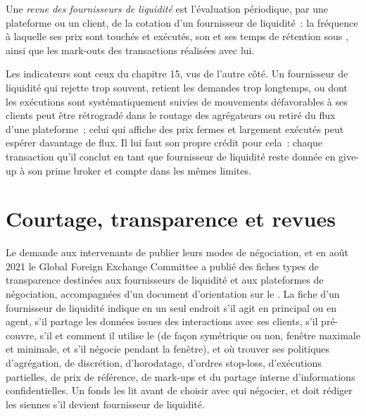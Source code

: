 \begin{definition}\label{def:m2:getting-access-fx:review}
Une \emph{revue des fournisseurs de liquidité} est l'évaluation périodique,
par une plateforme ou un client, de la cotation d'un fournisseur de liquidité~: la fréquence à laquelle ses prix
sont touchés et exécutés, son  et ses temps de rétention sous , ainsi que les
mark-outs des transactions réalisées avec lui.
\end{definition}

Les indicateurs sont ceux du chapitre 15, vus de l'autre côté. Un fournisseur de liquidité
qui rejette trop souvent, retient les demandes trop longtemps, ou dont les exécutions sont systématiquement
suivies de mouvements défavorables à ses clients peut être rétrogradé dans le routage des agrégateurs ou
retiré du flux d'une plateforme~; celui qui affiche des prix fermes et largement exécutés peut espérer davantage de flux.
Il lui faut son propre crédit pour cela~: chaque transaction qu'il conclut en tant que fournisseur de liquidité reste
donnée en give-up à son prime broker et compte dans les mêmes limites.

\section{Courtage, transparence et revues}

Le  demande aux intervenants de publier leurs modes de négociation, et en août
2021 le Global Foreign Exchange Committee a publié des fiches types de transparence
destinées aux fournisseurs de liquidité et aux plateformes de négociation, accompagnées d'un document d'orientation sur le .
La fiche d'un fournisseur de liquidité indique en un seul endroit s'il agit en principal ou
en agent, s'il partage les données issues des interactions avec ses clients, s'il pré-couvre, s'il
et comment il utilise le  (de façon symétrique ou non, fenêtre maximale et minimale, et
s'il négocie pendant la fenêtre), et où trouver ses politiques d'agrégation,
de discrétion, d'horodatage, d'ordres stop-loss, d'exécutions partielles, de prix de référence, de mark-ups
et du partage interne d'informations confidentielles. Un fonds les lit avant de
choisir avec qui négocier, et doit rédiger les siennes s'il devient fournisseur de liquidité.

